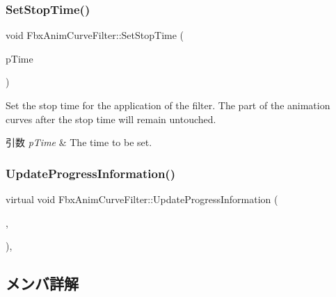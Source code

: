 \subsubsection{\texorpdfstring{Set\+Stop\+Time()}{SetStopTime()}}
{\footnotesize\ttfamily void Fbx\+Anim\+Curve\+Filter\+::\+Set\+Stop\+Time (\begin{DoxyParamCaption}\item[{\hyperlink{class_fbx_time}{Fbx\+Time} \&}]{p\+Time }\end{DoxyParamCaption})}

Set the stop time for the application of the filter. The part of the animation curves after the stop time will remain untouched. 
\begin{DoxyParams}{引数}
{\em p\+Time} & The time to be set. \\
\hline
\end{DoxyParams}
\mbox{\label{class_fbx_anim_curve_filter_ac9403f06db2fd928f29d68d755a26c1b}} 
\subsubsection{\texorpdfstring{Update\+Progress\+Information()}{UpdateProgressInformation()}}
{\footnotesize\ttfamily virtual void Fbx\+Anim\+Curve\+Filter\+::\+Update\+Progress\+Information (\begin{DoxyParamCaption}\item[{\hyperlink{class_fbx_time}{Fbx\+Time}}]{,  }\item[{\hyperlink{class_fbx_time}{Fbx\+Time}}]{ }\end{DoxyParamCaption})\hspace{0.3cm}{\ttfamily [protected]}, {\ttfamily [virtual]}}



\subsection{メンバ詳解}
\mbox{\label{class_fbx_anim_curve_filter_afb8079a673486763ec97bea38641bc54}} 

